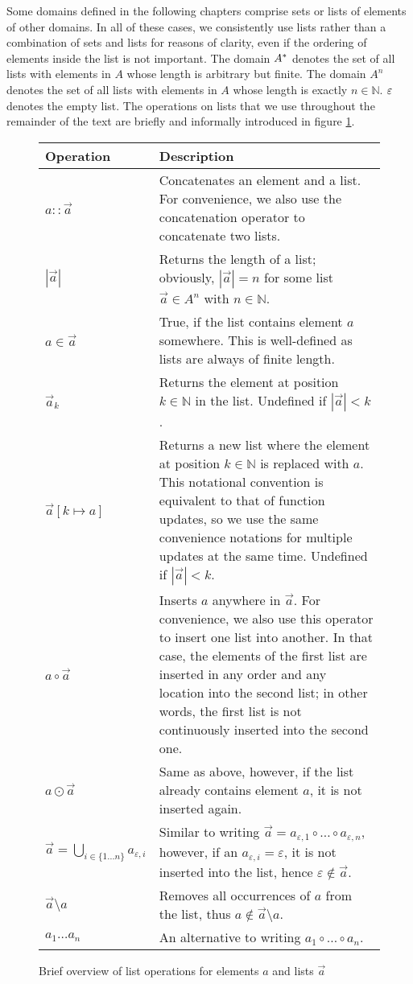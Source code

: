 \documentclass{article}
\begin{document}
	Some domains defined in the following chapters comprise sets or lists of elements of other domains. In all of these cases, we consistently use
	lists rather than a combination of sets and lists for reasons of clarity, even if the ordering of elements inside the list is not important.
	The domain $A^*$ denotes the set of all lists with elements in $A$ whose length is arbitrary but finite.
	The domain $A^n$ denotes the set of all lists with elements in $A$ whose length is exactly $n \in \mathbb{N}$. $\varepsilon$
	denotes the empty list. The operations on lists that we use throughout the remainder of the text are briefly and
	informally introduced in figure \ref{fig:ListOps}.
	\renewcommand{\arraystretch}{1.5}
	\begin{figure}[ht] 
		\centering
		\begin{tabular}{l | p{8.5cm}}
			Operation & Description \\ \hline \hline
			$a :: \vec{a}$ & Concatenates an element and a list. 
			For convenience, we also use the concatenation operator to concatenate two lists. \\ 
			$| \vec{a} |$ & Returns the length of a list;
			obviously, $| \vec{a} | = n $ for some list $\vec{a} \in A^n$ with $n \in \mathbb{N}$. \\ 
			$a \in \vec{a}$ & True, if the list contains element $a$ somewhere. This is well-defined as lists are always of finite length. \\
			$\vec{a}_k$ & Returns the element at position $k \in \mathbb{N}$ in the list. Undefined if $|\vec{a}| < k$. \\
			$\vec{a}[k \mapsto a]$ & Returns a new list where the element at position $k \in \mathbb{N}$ is replaced with $a$. This notational convention is equivalent
			to that of function updates, so we use the same convenience notations for multiple updates at the same time. Undefined if $|\vec{a}| < k$.\\
			$a \circ \vec{a}$ & Inserts $a$ anywhere in $\vec{a}$. For convenience, we also use this operator to insert one list into another.
			In that case, the elements of the first list are inserted in any order and any location into the second list; in other words, 
			the first list is not continuously inserted into the second one. \\
			$a \odot \vec{a}$ & Same as above, however, if the list already contains element $a$, it is not inserted again. \\
			$\vec{a} = \bigcup_{i \in \{ 1 \ldots n \}} a_{\varepsilon, i}$ & Similar to writing 
			$\vec{a} = a_{\varepsilon, 1} \circ \ldots \circ a_{\varepsilon, n}$, however, 
			if an $a_{\varepsilon, i} = \varepsilon$, it is not inserted into the list, hence $\varepsilon \notin \vec{a}$. \\
			$\vec{a} \setminus a$ & Removes all occurrences of $a$ from the list, thus $a \notin \vec{a} \setminus a$.  \\
			$a_1 \ldots a_n$ & An alternative to writing $a_1 \circ \ldots \circ a_n$.
		\end{tabular}
		\caption[Brief Overview of List Operations]{Brief overview of list operations for elements $a$ and lists $\vec{a}$}
		\label{fig:ListOps}
	\end{figure}
\end{document}
